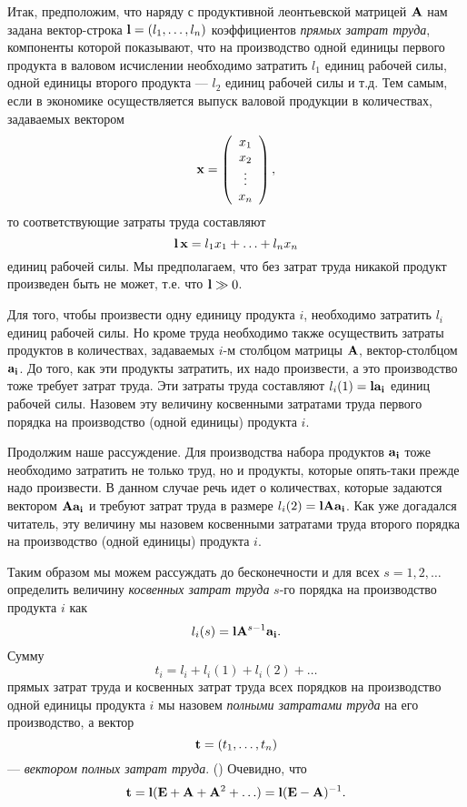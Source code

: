     Итак, предположим, что наряду с продуктивной леонтьевской  матрицей $\mathbf{A}$
    нам задана вектор-строка $\mathbf{l}=(l_{1},\ldots,l_{n})$
    коэффициентов \emph{прямых затрат труда}, компоненты которой
    показывают, что на производство одной единицы первого продукта в
    валовом исчислении
    необходимо затратить $l_{1}$ единиц рабочей силы, одной
    единицы второго продукта --- $l_{2}$ единиц рабочей силы и т.д.
    Тем самым, если в экономике осуществляется выпуск валовой
    продукции в количествах, задаваемых вектором
    \[\mathbf{x}=\left(
     \begin{array}{c}
        x_{1} \\
        x_{2} \\
        \vdots \\
        x_{n}  \\
      \end{array}
    \right),\]
    то соответствующие затраты труда составляют
    \[\mathbf{l}\,\mathbf{x}=l_{1}x_{1}+\ldots+l_{n}x_{n}\]
    единиц рабочей силы. Мы предполагаем, что без затрат труда
    никакой продукт произведен быть не может, т.е. что $\mathbf{l}\gg0$.


    Для того, чтобы произвести одну единицу продукта $i$, необходимо
    затратить $l_{i}$ единиц рабочей силы. Но кроме труда необходимо
    также осуществить затраты продуктов в количествах, задаваемых
    $i$-м столбцом матрицы $\mathbf{A}$, вектор-столбцом $\mathbf{a_{i}}$.
    До того, как эти продукты затратить, их надо произвести, а это
    производство тоже требует затрат труда. Эти затраты труда
    составляют $l_{i}(1)=\mathbf{l}\mathbf{a_{i}}$ единиц рабочей силы.
    Назовем эту величину косвенными затратами труда первого порядка
    на производство (одной единицы) продукта $i$.

    Продолжим наше рассуждение. Для производства набора
    продуктов $\mathbf{a_{i}}$ тоже необходимо затратить не только труд,
    но и продукты, которые опять-таки прежде надо произвести. В
    данном случае речь идет о количествах, которые задаются вектором
    $\mathbf{A}\mathbf{a_{i}}$ и требуют затрат труда в размере
    $l_{i}(2)=\mathbf{l}\mathbf{A}\mathbf{a_{i}}$. Как уже догадался читатель,
    эту величину мы назовем косвенными затратами труда второго
    порядка на производство (одной единицы) продукта $i$.

    Таким образом мы можем рассуждать до бесконечности и для всех
    $s=1,2,\ldots$ определить величину \emph{косвенных затрат труда}
    $s$-го порядка на производство продукта $i$ как
    \[l_{i}(s)=\mathbf{l}\mathbf{A}^{s-1}\mathbf{a_{i}}.\]
    Сумму
    \[t_{i}=l_{i}+l_{i}(1)+l_{i}(2)+\ldots\]
    прямых  затрат труда и косвенных  затрат труда всех
    порядков на производство одной единицы продукта $i$ мы назовем \emph{полными
     затратами труда} на его производство, а вектор
    \[\mathbf{t}=(t_{1},\ldots,t_{n})\]
    --- \emph{вектором полных затрат труда}. ()
    Очевидно, что
\begin{equation}
 \label{polnie zatrati truda}
    \mathbf{t}=\mathbf{l}(\mathbf{E}+\mathbf{A}+\mathbf{A}^{2}+\ldots)
    =\mathbf{l}(\mathbf{E}-\mathbf{A})^{-1}.
\end{equation}

